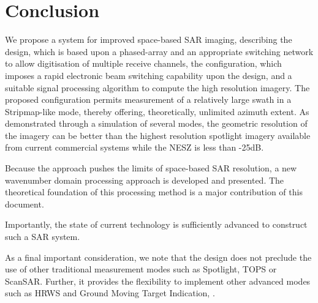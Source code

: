 \section{Conclusion}
We propose a system for improved space-based SAR imaging, describing the design, which is based upon a phased-array and an appropriate switching network to allow digitisation of multiple receive channels, the configuration, which imposes a rapid electronic beam switching capability upon the design, and a suitable signal processing algorithm to compute the high resolution imagery. The proposed configuration permits measurement of a relatively large swath in a Stripmap-like mode, thereby offering, theoretically, unlimited azimuth extent. As demonstrated through a simulation of several modes, the geometric resolution of the imagery can be better than the highest resolution spotlight imagery available from current commercial systems while the NESZ is less than -25dB.
\par
Because the approach pushes the limits of space-based SAR resolution, a new wavenumber domain processing approach is developed and presented. The theoretical foundation of this processing method is a major contribution of this document.   
\par
Importantly, the state of current technology is sufficiently advanced to construct such a SAR system.
\par
As a final important consideration, we note that the design does not preclude the use of other traditional measurement modes such as Spotlight, TOPS or ScanSAR. Further, it provides the flexibility to implement other advanced modes such as HRWS and Ground Moving Target Indication, \cite{Sikaneta2014, SikanetaGierullTGRS2015, SikanetaCeruttiKlareGierullIGARSS2014, Cerutti-Maori2010b, Gierull2012, Chiu2004}.
